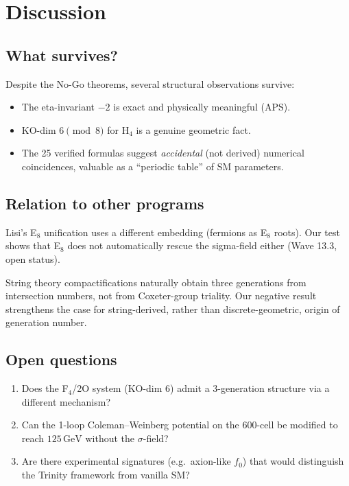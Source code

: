 \documentclass[11pt,a4paper]{article}
\theoremstyle{definition}
\begin{document}
\section{Discussion}\label{sec:discussion}

\subsection{What survives?}

Despite the No-Go theorems, several structural observations survive:
\begin{itemize}
  \item The eta-invariant $-2$ is exact and physically meaningful (APS).
  \item KO-dim $6 \pmod 8$ for H$_4$ is a genuine geometric fact.
  \item The 25 verified formulas suggest \emph{accidental} (not derived)
    numerical coincidences, valuable as a ``periodic table'' of SM
    parameters.
\end{itemize}

\subsection{Relation to other programs}

Lisi's E$_8$ unification \cite{Lisi:2007} uses a different embedding
(fermions as E$_8$ roots). Our test shows that E$_8$ does not
automatically rescue the sigma-field either (Wave 13.3, open status).

String theory compactifications naturally obtain three generations from
intersection numbers, not from Coxeter-group triality. Our negative result
strengthens the case for string-derived, rather than discrete-geometric,
origin of generation number.

\subsection{Open questions}

\begin{enumerate}
  \item Does the F$_4$/2O system (KO-dim $6$) admit a 3-generation structure
    via a different mechanism?
  \item Can the 1-loop Coleman--Weinberg potential on the 600-cell be
    modified to reach $125\,\text{GeV}$ without the $\sigma$-field?
  \item Are there experimental signatures (e.g.~axion-like $f_0$) that
    would distinguish the Trinity framework from vanilla SM?
\end{enumerate}
\end{document}
